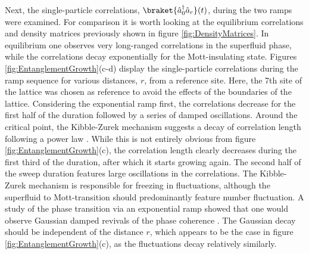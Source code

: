 Next, the single-particle correlations, $\braket{\hat{a}_{0}^{\dag} \hat{a}_{r}}(t)$, during the two ramps were examined. For comparison it is worth looking at the equilibrium correlations and density matrices previously shown in figure \ref{fig:DensityMatrices}. In equilibrium one observes very long-ranged correlations in the superfluid phase, while the correlations decay exponentially for the Mott-insulating state. Figures \ref{fig:EntanglementGrowth}(c-d) display the single-particle correlations during the ramp sequence for various distances, $r$, from a reference site. Here, the 7th site of the lattice was chosen as reference to avoid the effects of the boundaries of the lattice.
Considering the exponential ramp first, the correlations decrease for the first half of the duration followed by a series of damped oscillations. Around the critical point, the Kibble-Zurek mechanism suggests a decay of correlation length following a power law \cite{Zurek2005}. While this is not entirely obvious from figure \ref{fig:EntanglementGrowth}(c), the correlation length clearly decreases during the first third of the duration, after which it starts growing again. The second half of the sweep duration features large oscillations in the correlations. The Kibble-Zurek mechanism is responsible for freezing in fluctuations, although the superfluid to Mott-transition should predominantly feature number fluctuation. A study of the phase transition via an exponential ramp showed that one would observe Gaussian damped revivals of the phase coherence \cite{Schutzhold2006}. The Gaussian decay should be independent of the distance $r$, which appears to be the case in figure \ref{fig:EntanglementGrowth}(c), as the fluctuations decay relatively similarly.

